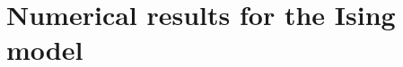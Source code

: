 \documentclass[9pt, ebook, openany, oneside]{memoir}
\begin{document}
\chapter{Numerical results for the Ising model}


% 

\appendix
% 
%
% 

% 


\backmatter
\printbibliography
\end{document}
